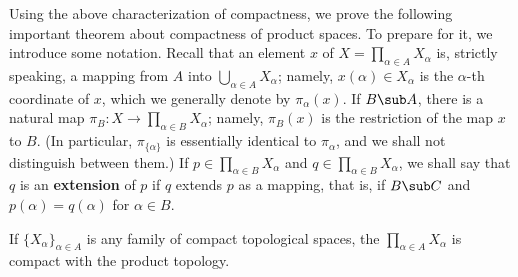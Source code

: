 Using the above characterization of compactness, we prove the following important theorem about compactness of product spaces. To prepare for it, we introduce some notation. Recall that an element $x$ of $X=\prod_{\alpha\in A}X_\alpha$ is, strictly speaking, a mapping from $A$ into $\bigcup_{\alpha\in A}X_\alpha$; namely, $x(\alpha)\in X_\alpha$ is the $\alpha$-th coordinate of $x$, which we generally denote by $\pi_\alpha(x)$. If $B\sub A$, there is a natural map $\pi_B:X\to\prod_{\alpha\in B}X_\alpha$; namely, $\pi_B(x)$ is the restriction of the map $x$ to $B$. (In particular, $\pi_{\{\alpha\}}$ is essentially identical to $\pi_\alpha$, and we shall not distinguish between them.) If $p\in\prod_{\alpha\in B}X_\alpha$ and $q\in\prod_{\alpha\in B}X_\alpha$, we shall say that $q$ is an \textbf{extension} of $p$ if $q$ extends $p$ as a mapping, that is, if $B\sub C$ and $p(\alpha)=q(\alpha)$ for $\alpha\in B$.
\begin{theorem}
If $\{X_\alpha\}_{\alpha\in A}$ is any family of compact topological spaces, the $\prod_{\alpha\in A}X_\alpha$ is compact with the product topology.
\end{theorem}
